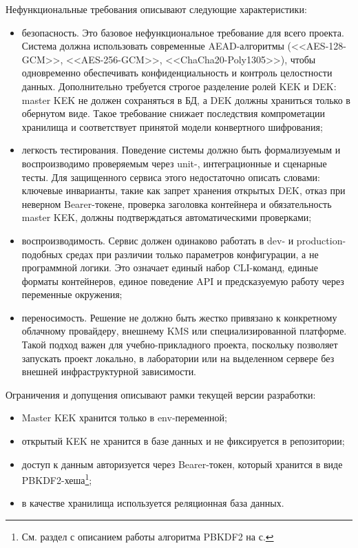 \documentclass[14pt, a4paper]{extarticle}
\begin{document}
	Нефункциональные требования описывают следующие характеристики:
	
	\begin{itemize}
		\item безопасность. Это базовое нефункциональное требование для всего проекта. Система должна использовать современные AEAD-алгоритмы (<<AES-128-GCM>>, <<AES-256-GCM>>, <<ChaCha20-Poly1305>>), чтобы одновременно обеспечивать конфиденциальность и контроль целостности данных. Дополнительно требуется строгое разделение ролей KEK и DEK: master KEK не должен сохраняться в БД, а DEK должны храниться только в обернутом виде. Такое требование снижает последствия компрометации хранилища и соответствует принятой модели конвертного шифрования;
		\item легкость тестирования. Поведение системы должно быть формализуемым и воспроизводимо проверяемым через unit-, интеграционные и сценарные тесты. Для защищенного сервиса этого недостаточно описать словами: ключевые инварианты, такие как запрет хранения открытых DEK, отказ при неверном Bearer-токене, проверка заголовка контейнера и обязательность master KEK, должны подтверждаться автоматическими проверками;
		\item воспроизводимость. Сервис должен одинаково работать в dev- и production-подобных средах при различии только параметров конфигурации, а не программной логики. Это означает единый набор CLI-команд, единые форматы контейнеров, единое поведение API и предсказуемую работу через переменные окружения;
		\item переносимость. Решение не должно быть жестко привязано к конкретному облачному провайдеру, внешнему KMS или специализированной платформе. Такой подход важен для учебно-прикладного проекта, поскольку позволяет запускать проект локально, в лаборатории или на выделенном сервере без внешней инфраструктурной зависимости.
	\end{itemize}
	
	Ограничения и допущения описывают рамки текущей версии разработки:
	
	\begin{itemize}
	\item Master KEK хранится только в env-переменной;
	\item открытый KEK не хранится в базе данных и не фиксируется в репозитории;
	\item доступ к данным авторизуется через Bearer-токен, который хранится в виде PBKDF2-хеша\footnote{См. раздел с описанием работы алгоритма PBKDF2 на с. \pageref{def:PBKDF2}};
	\item в качестве хранилища используется реляционная база данных.
	\end{itemize}
	
\end{document}
